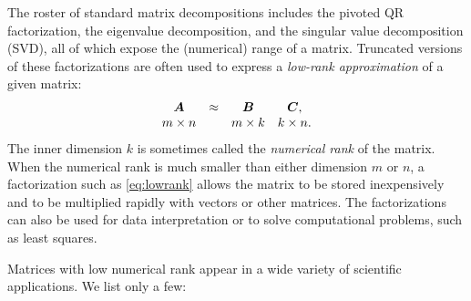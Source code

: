 \documentclass[final]{siamltex}
\newcommand{\notate}[1]{\textcolor{red}{\textbf{[#1]}}}
\begin{document}
The roster of standard matrix decompositions includes the pivoted QR
factorization, the eigenvalue decomposition, and the singular value
decomposition (SVD), all of which expose the (numerical) range of a
matrix. Truncated versions of these factorizations are often used to
express a \emph{low-rank approximation} of a given matrix:
\begin{equation}
\label{eq:lowrank}
\begin{array}{ccccccccccc}
\mtx{A} &\approx& \mtx{B} & \mtx{C},\\
m\times n && m \times k & k\times n.
\end{array}
\end{equation}
The inner dimension $k$ is sometimes called the \emph{numerical rank} of the matrix.
When the numerical rank is much smaller than either dimension $m$ or $n$,
a factorization such as \eqref{eq:lowrank} allows the matrix to be stored
inexpensively and to be multiplied rapidly with vectors or other matrices.
The factorizations can also be used for data interpretation or to
solve computational problems, such as least squares.

Matrices with low numerical rank appear in a wide variety of scientific
applications.  We list only a few:

\end{document}
